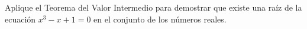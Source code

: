 \setcounter{enumi}{56}
\item Aplique el Teorema del Valor Intermedio para demostrar que existe una raíz de la ecuación $x^3 - x + 1 = 0$ en el conjunto de los números reales.
